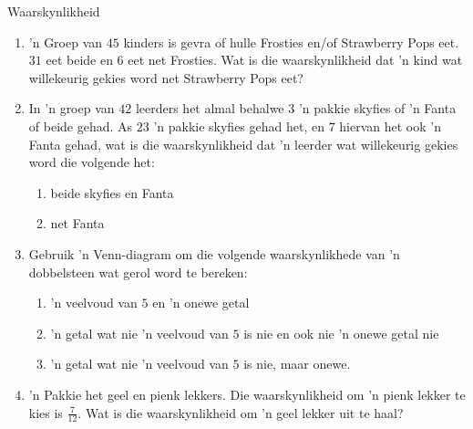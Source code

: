 \begin{eocexercises}{Waarskynlikheid}
  \begin{enumerate}[itemsep=5pt, label=\textbf{\arabic*}.]
  \item 'n Groep van $45$ kinders is gevra of hulle  Frosties en/of
    Strawberry Pops eet. $31$ eet beide en $6$ eet net Frosties.  Wat is die waarskynlikheid dat 'n kind wat willekeurig gekies word net Strawberry
    Pops eet?
  \item In 'n groep van $42$ leerders het almal behalwe $3$ 'n pakkie skyfies of 'n Fanta of beide gehad. As $23$ 'n pakkie skyfies gehad het, en $7$ hiervan het ook 'n Fanta gehad, wat is die waarskynlikheid dat 'n leerder wat willekeurig gekies word die volgende het:
    \begin{enumerate}[noitemsep, label=\textbf{(\alph*)} ]
    \item beide skyfies en Fanta
    \item net Fanta
    \end{enumerate}
  \item Gebruik 'n Venn-diagram om die volgende waarskynlikhede van 'n dobbelsteen wat gerol word te bereken:
    \begin{enumerate}[noitemsep, label=\textbf{(\alph*)} ]
    \item 'n veelvoud van $5$ en 'n onewe getal
    \item 'n getal wat nie 'n veelvoud van $5$ is nie en ook nie 'n onewe getal nie
    \item 'n getal wat nie 'n veelvoud van $5$ is nie, maar onewe.
    \end{enumerate}
  \item 'n Pakkie het geel en pienk lekkers. Die waarskynlikheid om 'n pienk lekker te kies is $\frac{7}{12}$.
Wat is die waarskynlikheid om 'n geel lekker uit te haal?


\end{enumerate}
\end{eocexercises}
